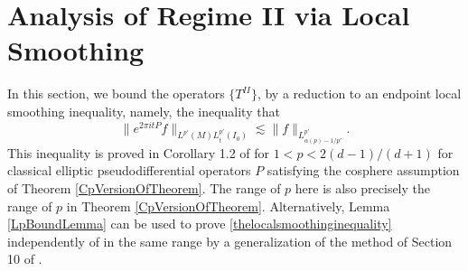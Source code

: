 \begin{comment}






% 


\end{comment}








\section{Analysis of Regime II via Local Smoothing} \label{regime2finalsection}

In this section, we bound the operators $\{ T^{II} \}$, by a reduction to an endpoint local smoothing inequality, namely, the inequality that
%
\begin{equation} \label{thelocalsmoothinginequality}
    \| e^{2\pi i t P} f \|_{L^{p'}(M) L^{p'}_t(I_0)} \lesssim \| f \|_{L^{p'}_{\alpha(p) - 1/p'}}.
\end{equation}
%
This inequality is proved in Corollary 1.2 of \cite{LeeSeeger} for $1 < p < 2(d-1)/(d+1)$ for classical elliptic pseudodifferential operators $P$ satisfying the cosphere assumption of Theorem \ref{CpVersionOfTheorem}. The range of $p$ here is also precisely the range of $p$ in Theorem \ref{CpVersionOfTheorem}. Alternatively, Lemma \ref{LpBoundLemma} can be used to prove \eqref{thelocalsmoothinginequality} independently of \cite{LeeSeeger} in the same range by a generalization of the method of Section 10 of \cite{HeoandNazarovandSeeger}.

